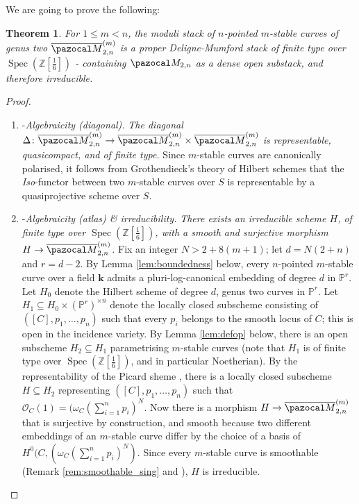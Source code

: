 \documentclass{compositio}
\newcommand{\PP}{\mathbb P}
\renewcommand{\k}{\mathbf k}
\newcommand{\OO}{\mathcal O}
\renewcommand{\to}{\rightarrow}
\newcommand{\oM}{\overline{\pazocal M}}
\theoremstyle{plain}
\newtheorem{thm}{Theorem}[section]
\theoremstyle{definition}
\theoremstyle{remark}
\begin{document}
We are going to prove the following:
\begin{thm}
 For $1\leq m <n$, the moduli stack of $n$-pointed $m$-stable curves of genus two $\oM_{2,n}^{(m)}$ is a proper Deligne-Mumford stack of finite type over $\operatorname{Spec}(\mathbb Z[\frac{1}{6}])$ - containing $\pazocal M_{2,n}$ as a dense open substack, and therefore irreducible.
\end{thm}
\begin{proof}
 \begin{enumerate}
  \item-\emph{Algebraicity (diagonal).} \emph{The diagonal $\Delta\colon \oM_{2,n}^{(m)}\to \oM_{2,n}^{(m)}\times\oM_{2,n}^{(m)}$ is representable, quasicompact, and of finite type.} Since $m$-stable curves are canonically polarised, it follows from Grothendieck's theory of Hilbert schemes that the \emph{Iso}-functor between two $m$-stable curves over $S$ is representable by a quasiprojective scheme over $S$.
  
  \item-\emph{Algebraicity (atlas) \& irreducibility.} \emph{There exists an irreducible scheme $H$, of finite type over $\operatorname{Spec}(\mathbb Z[\frac{1}{6}])$, with a smooth and surjective morphism $H\to \oM_{2,n}^{(m)}$.} Fix an integer $N>2+8(m+1)$; let $d=N(2+n)$ and $r=d-2$. By Lemma \ref{lem:boundedness} below, every $n$-pointed $m$-stable curve over a field $\k$ admits a pluri-log-canonical embedding of degree $d$ in $\PP^r$. Let $H_0$ denote the Hilbert scheme of degree $d$, genus two curves in $\PP^r$. Let $H_1\subseteq H_0\times(\PP^r)^{\times n}$ denote the locally closed subscheme consisting of $([C],p_1,\ldots,p_n)$ such that every $p_i$ belongs to the smooth locus of $C$; this is open in the incidence variety. By Lemma \ref{lem:defop} below, there is an open subscheme $H_2\subseteq H_1$ parametrising $m$-stable curves (note that $H_1$ is of finite type over $\operatorname{Spec}(\mathbb Z[\frac{1}{6}])$, and in particular Noetherian). By the representability of the Picard sheme \cite[Proposition 5.1]{GIT}, there is a locally closed subscheme $H\subseteq H_2$ representing $([C],p_1,\ldots,p_n)$ such that $\OO_C(1)=(\omega_C(\sum_{i=1}^np_i)^N$. Now there is a morphism $H\to \oM_{2,n}^{(m)}$ that is surjective by construction, and smooth because two different embeddings of an $m$-stable curve differ by the choice of a basis of $H^0(C,(\omega_C(\sum_{i=1}^np_i)^N)$. Since every $m$-stable curve is smoothable (Remark \ref{rem:smoothable_sing} and \cite[II.6.3]{Kollar-rational}), $H$ is irreducible.
  

\end{enumerate}
\end{proof}
\end{document}
